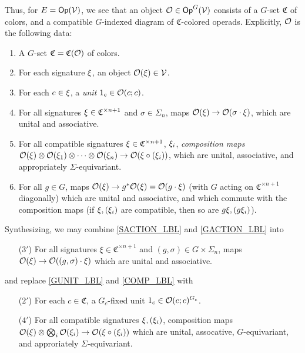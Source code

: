 \documentclass[a4paper,10pt
,draft
]{article}%
\renewcommand{\1}{\ensuremath{\mathbb{id}}}
\begin{document}
Thus, for $E = \mathsf{Op}(\mathcal V)$, we see that an object $\mathcal{O} \in \mathsf{Op}^G(\mathcal V)$ consists of
a $G$-set $\mathfrak C$ of colors, and a compatible $G$-indexed diagram of $\mathfrak C$-colored operads.
Explicitly, $\mathcal{O}$ is the following data:
\begin{enumerate}[label = (\arabic*), start = 0]
\item A $G$-set $\mathfrak C = \mathfrak C(\mathcal{O})$ of colors.
\item For each signature $\xi$, an object $\mathcal{O}(\xi) \in \mathcal V$.
\item \label{GUNIT_LBL} 
      For each $c \in \xi$, a \textit{unit} $1_c \in \mathcal{O}(c;c)$.
\item \label{SACTION_LBL}
      For all signatures $\xi \in \mathfrak C^{\times n + 1}$ and $\sigma \in \Sigma_n$, maps $\mathcal{O}(\xi) \to \mathcal{O}(\sigma \cdot \xi)$,
      which are unital and associative.
\item \label{COMP_LBL}
      For all compatible signatures $\xi \in \mathfrak C^{\times n+1}$, $\xi_i$,
      \textit{composition maps} $\mathcal{O}(\xi) \otimes \mathcal{O}(\xi_1) \otimes \dots \otimes \mathcal{O}(\xi_n) \to \mathcal{O}(\xi \circ (\xi_i))$,
      which are unital, associative, and appropriately $\Sigma$-equivariant.
\item \label{GACTION_LBL}
      For all $g \in G$, maps $\O(\ksi) \to g^{\**}\O(\ksi) = \O(g \cdot \ksi)$
      (with $G$ acting on $\mathfrak C^{\times n+1}$ diagonally)
      which are unital and associative, and which commute with the composition maps
      (if $\xi, (\xi_i)$ are compatible, then so are $g \xi, (g \xi_i)$).
\end{enumerate}
Synthesizing, we may combine \ref{SACTION_LBL} and \ref{GACTION_LBL} into
\begin{enumerate}
\item[($3'$)] For all signatures $\xi \in \mathfrak C^{\times n+1}$ and $(g,\sigma) \in G\times \Sigma_n$, maps
      $\mathcal{O}(\xi) \to \mathcal{O}((g,\sigma)\cdot \xi)$
      which are unital and associative.
\end{enumerate}

and replace \ref{GUNIT_LBL} and \ref{COMP_LBL} with
\begin{enumerate}
\item[($2'$)] For each $c \in \mathfrak C$, a $G_c$-fixed unit $1_c \in \mathcal{O}(c;c)^{G_c}$.
\item[($4'$)] For all compatible signatures $\xi, (\xi_i)$,
      composition maps $\mathcal{O}(\xi) \otimes \bigotimes_i \mathcal{O}(\xi_i) \to \mathcal{O}(\xi \circ (\xi_i))$
      which are unital, assocative, $G$-equivariant, and approriately $\Sigma$-equivariant.
\end{enumerate}
\end{document}
